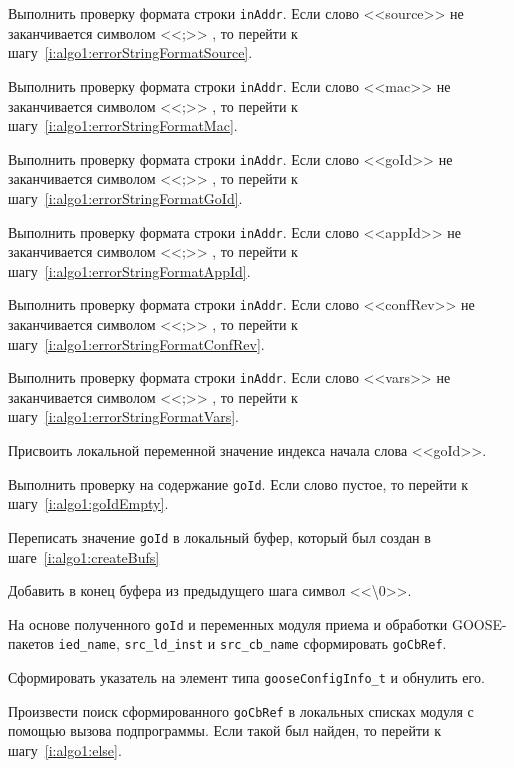 \begin{enumerate_step}
    \item Выполнить проверку формата строки \lstinline{inAddr}. Если слово <<source>> не
    заканчивается символом <<;>> , то перейти к шагу~\ref{i:algo1:errorStringFormatSource}.
    \item Выполнить проверку формата строки \lstinline{inAddr}. Если слово <<mac>> не
    заканчивается символом <<;>> , то перейти к шагу~\ref{i:algo1:errorStringFormatMac}.
    \item Выполнить проверку формата строки \lstinline{inAddr}. Если слово <<goId>> не
    заканчивается символом <<;>> , то перейти к шагу~\ref{i:algo1:errorStringFormatGoId}.
    \item Выполнить проверку формата строки \lstinline{inAddr}. Если слово <<appId>> не
    заканчивается символом <<;>> , то перейти к шагу~\ref{i:algo1:errorStringFormatAppId}.
    \item Выполнить проверку формата строки \lstinline{inAddr}. Если слово <<confRev>> не
    заканчивается символом <<;>> , то перейти к шагу~\ref{i:algo1:errorStringFormatConfRev}.
    \item Выполнить проверку формата строки \lstinline{inAddr}. Если слово <<vars>> не
    заканчивается символом <<;>> , то перейти к шагу~\ref{i:algo1:errorStringFormatVars}.

    \item Присвоить локальной переменной значение индекса начала слова <<goId>>.
    \item Выполнить проверку на содержание \lstinline{goId}. Если слово пустое, то перейти к шагу~\ref{i:algo1:goIdEmpty}.
    \item Переписать значение \lstinline{goId} в локальный буфер, который был создан в шаге~\ref{i:algo1:createBufs}
    \item Добавить в конец буфера из предыдущего шага символ <<\textbackslash 0>>.

    \item На основе полученного \lstinline{goId} и переменных модуля приема и обработки GOOSE-пакетов \lstinline{ied_name}, \lstinline{src_ld_inst} и \lstinline{src_cb_name} сформировать
    \lstinline{goCbRef}.

    \item \label{i:algo1:formElem} Сформировать указатель на элемент типа \lstinline{gooseConfigInfo_t} и обнулить его.
    \item Произвести поиск сформированного \lstinline{goCbRef} в локальных списках модуля с помощью вызова подпрограммы. Если такой был найден, то перейти к шагу~\ref{i:algo1:else}.


\end{enumerate_step}
